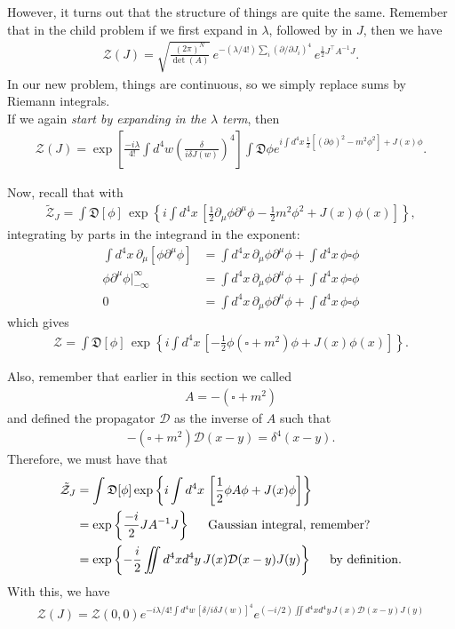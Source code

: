 \documentclass{book}
\theoremstyle{definition}
\newcommand{\p}{\partial}
\newcommand{\f}[2]{\frac{#1}{#2}}
\newcommand{\lp}{\left(}
\newcommand{\rp}{\right)}
\newcommand{\lb}{\left[}
\newcommand{\rb}{\right]}
\newcommand{\lc}{\left\{}
\newcommand{\rc}{\right\}}
\newcommand{\D}{\mathcal{D}}
\newcommand{\Z}{\mathcal{Z}}
\begin{document}
However, it turns out that the structure of things are quite the same. Remember that in the child problem if we first expand in $\lambda$, followed by in $J$, then we have
\begin{align}
\Z(J) =  \sqrt{\f{(2\pi)^N}{\det(A)}}\, e^{-(\lambda/4!) \sum_i (\p/\p J_i)^4} \, e^{\f{1}{2}J^\top A^{-1} J}.
\end{align}
In our new problem, things are continuous, so we simply replace sums by Riemann integrals.\\

If we again \textit{start by expanding in the $\lambda$ term}, then
\begin{align}
\Z(J)= \exp\lb \f{-i\lambda}{4!} \int d^4w\lp \f{\delta}{i \delta  J(w)}\rp^4 \rb \int \mathfrak{D}\phi e^{ i\int d^4x\,  \f{1}{2}\lb(\p \phi)^2 - m^2 \phi^2 \rb + J(x)\phi }.
\end{align} 

Now, recall that with
\begin{align}
\tilde{\Z}_J = \int \mathfrak{D}[\phi]\, \exp\lc i\int d^4x\, \lb \f{1}{2}\p_\mu \phi \p^\mu \phi - \f{1}{2}m^2\phi^2 + J(x)\phi(x) \rb \rc,
\end{align}
integrating by parts in the integrand in the exponent:
\begin{align}
\int d^4x\,\p_\mu \lb \phi \p^\mu \phi \rb &= \int d^4x\, \p_\mu \phi \p^\mu \phi   + \int d^4x\, \phi \square \phi \\ 
\phi\p^\mu\phi\bigg\vert^\infty_{-\infty} &= \int d^4x\, \p_\mu \phi \p^\mu \phi   + \int d^4x\, \phi \square \phi  \\ 
0 &= \int d^4x\, \p_\mu \phi \p^\mu \phi   + \int d^4x\, \phi \square \phi
\end{align}
which gives
\begin{align}
\Z = \int \mathfrak{D}[\phi]\, \exp\lc i\int d^4x\, \lb -\f{1}{2}\phi(\square + m^2) \phi  + J(x)\phi(x) \rb\rc.
\end{align}


Also, remember that earlier in this section we called
\begin{align}
A = -(\square + m^2)
\end{align}
and defined the propagator $\D$ as the inverse of $A$ such that
\begin{align}
-(\square + m^2)\D(x-y) = \delta^4(x-y).
\end{align}
Therefore, we must have that
\begin{align}
\tilde{\Z}_J &= \int \mathfrak{D}[\phi]\exp\lc i\int d^4x \,\lb \f{1}{2} \phi A \phi + J(x)\phi \rb\rc \nonumber\\
&= \exp\lc \f{-i}{2}JA^{-1}J \rc \hspace{0.5cm}\text{Gaussian integral, remember?} \nonumber \\ 
&= \exp\lc -\f{i}{2}\iint d^4x d^4y\, J(x)\D(x-y)J(y) \rc \hspace{0.5cm}\text{by definition.}
\end{align}
With this, we have
\begin{align}
\boxed{\Z(J) = \Z(0,0)e^{ -i\lambda/4! \int d^4w\, [\delta/i \delta  J(w)]^4 } e^{ (-i/2)\iint d^4x d^4y\, J(x)\D(x-y)J(y) }}
\end{align}
\end{document}
